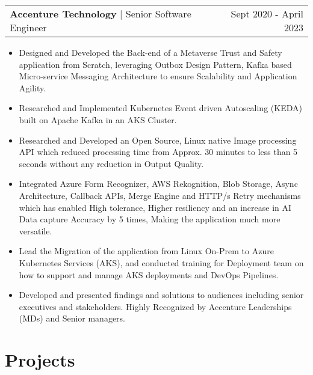 \documentclass[a4paper,12pt]{article}
\makeatletter
\newenvironment{joblong}[3]
    {
    \begin{tabularx}{\linewidth}{@{}l X r@{}}
    \textbf{#1} | #2 & \hfill &  #3 \\[3.75pt]
    \end{tabularx}
    \begin{minipage}[t]{\linewidth}
    \begin{itemize}[nosep,after=\strut, leftmargin=1em, itemsep=3pt,label=-]
    }
    {
    \end{itemize}
    \end{minipage}    
    }
\makeatother
\begin{document}
\begin{joblong}{Accenture Technology}{Senior Software Engineer}{Sept 2020 - April 2023}

\item Designed and Developed the Back-end of a Metaverse Trust and Safety application from Scratch, leveraging Outbox Design Pattern, Kafka based Micro-service Messaging Architecture to ensure Scalability and Application Agility.
\item Researched and Implemented Kubernetes Event driven Autoscaling (KEDA) built on Apache Kafka in an AKS Cluster.
\item Researched and Developed an Open Source, Linux native Image processing API which reduced processing time from Approx. 30 minutes to less than 5 seconds without any reduction in Output Quality.
\item Integrated Azure Form Recognizer, AWS Rekognition, Blob Storage, Async Architecture, Callback APIs, Merge Engine and HTTP/s Retry mechanisms which has enabled High tolerance, Higher resiliency and an increase in AI Data capture Accuracy by 5 times, Making the application much more versatile.
\item Lead the Migration of the application from Linux On-Prem to Azure Kubernetes Services (AKS), and conducted training for Deployment team on how to support and manage AKS deployments and DevOps Pipelines.
\item Developed and presented findings and solutions to audiences including senior executives and stakeholders. Highly Recognized by Accenture Leaderships (MDs) and Senior managers.

\end{joblong}

  
\section{Projects}
\end{document}
